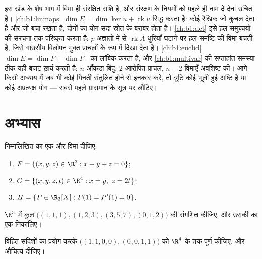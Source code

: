 \begin{remark}[पुस्तक 3 के भीतर के परिदृश्य]
\label{rem:b1:findim:perspectives}
इस खंड के शेष भाग में विमा ही संरक्षित राशि है, और संरक्षण के नियमों को पहले
ही नाम दे देना उचित है। \cref{ch:b1:linmaps} $\dim E = \dim\ker u +
\operatorname{rk} u$ सिद्ध करता है: कोई रैखिक  जो कुचल देता है और
जो बचा रखता है, दोनों का योग सदा स्रोत के बराबर होता है। \cref{ch:b1:det}
इसे हल-समुच्चयों की संरचना तक परिष्कृत करता है: $p$ अज्ञातों में से
$\operatorname{rk} A$ धुरियाँ घटाने पर हल-समष्टि की विमा बचती है, जिसे
गाउसीय विलोपन मुक्त प्राचलों के रूप में दिखा देता है। \cref{ch:b1:euclid}
$\dim E = \dim F + \dim F^\perp$ का लांबिक  करता है, और
\cref{ch:b1:multivar} की सप्ताहांत समस्या ठीक यही बजट ख़र्च करती है: $n$
आँकड़ा-बिंदु, $2$ आरोपित प्राचल, $n - 2$ विमाएँ अवशिष्ट की। आगे किसी अध्याय
में जब भी कोई गिनती संतुलित होने से इनकार करे, तो त्रुटि कोई भूली हुई अष्टि
है या कोई अप्रत्यक्ष योग --- सबसे पहले ग्रासमान के सूत्र पर लौटिए।
\end{remark}

\section{अभ्यास}

\begin{exercise}[$\star$]\label{exo:b1:findim:1}
निम्नलिखित का एक  और विमा दीजिए:
\begin{enumerate}
  \item $F = \{(x,y,z) \in \R^3 : x + y + z = 0\}$;
  \item $G = \{(x,y,z,t) \in \R^4 : x = y,\ z = 2t\}$;
  \item $H = \{P \in \R_3[X] : P(1) = P'(1) = 0\}$.
\end{enumerate}
\end{exercise}

\begin{exercise}[$\star$]\label{exo:b1:findim:2}
$\R^3$ में कुल $\bigl((1,1,1), (1,2,3), (3,5,7), (0,1,2)\bigr)$ की 
संगणित कीजिए, और उसकी  का एक  निकालिए।
\end{exercise}

\begin{exercise}[$\star$]\label{exo:b1:findim:3}
विहित सदिशों का प्रयोग करके  $\bigl((1,1,0,0), (0,0,1,1)\bigr)$
को $\R^4$ के  तक पूर्ण कीजिए, और औचित्य दीजिए।
\end{exercise}

